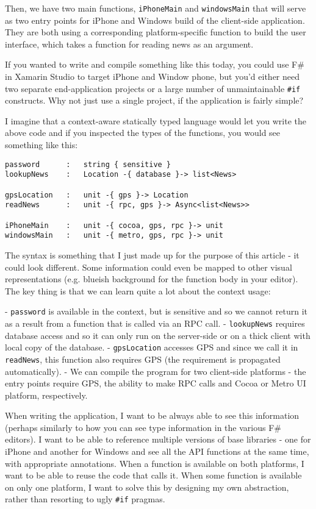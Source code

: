 Then, we have two main functions, \texttt{iPhoneMain} and \texttt{windowsMain} that will serve as two entry points
for iPhone and Windows build of the client-side application. They are both using a corresponding
platform-specific function to build the user interface, which takes a function for reading news as an
argument.

If you wanted to write and compile something like this today, you could use F\# in Xamarin 
Studio to target iPhone and Window phone, but you'd either need two separate end-application projects 
or a large number of unmaintainable \texttt{\#if} constructs. Why not just use a single project, if 
the application is fairly simple?

I imagine that a context-aware statically typed language would let you write the above code and 
if you inspected the types of the functions, you would see something like this:

\begin{verbatim}
password      :   string { sensitive }
lookupNews    :   Location -{ database }-> list<News> 

gpsLocation   :   unit -{ gps }-> Location 
readNews      :   unit -{ rpc, gps }-> Async<list<News>> 

iPhoneMain    :   unit -{ cocoa, gps, rpc }-> unit 
windowsMain   :   unit -{ metro, gps, rpc }-> unit 
\end{verbatim}

The syntax is something that I just made up for the purpose of this article - it could
look different. Some information could even be mapped to other visual representations
(e.g. blueish background for the function body in your editor). The key thing is that
we can learn quite a lot about the context usage:

 - \texttt{password} is available in the context, but is sensitive and so we cannot return it
   as a result from a function that is called via an RPC call.
 - \texttt{lookupNews} requires database access and so it can only run on the server-side
   or on a thick client with local copy of the database.
 - \texttt{gpsLocation} accesses GPS and since we call it in \texttt{readNews}, this function
   also requires GPS (the requirement is propagated automatically).
 - We can compile the program for two client-side platforms - the entry points require
   GPS, the ability to make RPC calls and Cocoa or Metro UI platform, respectively.

When writing the application, I want to be always able to see this information (perhaps
similarly to how you can see type information in the various F\# editors). I want to be
able to reference multiple versions of base libraries - one for iPhone and another for
Windows and see all the API functions at the same time, with appropriate annotations.
When a function is available on both platforms, I want to be able to reuse the code that
calls it. When some function is available on only one platform, I want to solve this by
designing my own abstraction, rather than resorting to ugly \texttt{\#if} pragmas.

